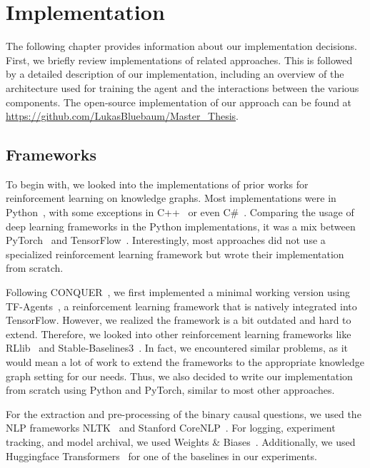 %
\chapter{Implementation}
\label{ch:implementation}

The following chapter provides information about our implementation decisions.
First, we briefly review implementations of related approaches. This is 
followed by a detailed description of our implementation, 
including an overview of the architecture used for training the agent and the interactions between the various components.
The open-source implementation of our approach can be found at \url{https://github.com/LukasBluebaum/Master_Thesis}.

\section{Frameworks}
\label{sec:frameworks}

To begin with, we looked into the implementations of prior works for reinforcement 
learning on knowledge graphs. Most implementations were in Python~\cite{Xiong2017DeePpath,Das2018Minerva, Kaiser2021Reinforcement},
with some exceptions in C++~\cite{Zhang2018Variational} or even C\#~\cite{Shen2018MWalk}.
Comparing the usage of deep learning frameworks in the Python implementations, it was a mix between PyTorch~\cite{Paszke2019Torch} and TensorFlow~\cite{Abadi2015Tensorflow}.
Interestingly, most approaches did not use a specialized reinforcement learning framework but
wrote their implementation from scratch. 

Following CONQUER~\cite{Kaiser2021Reinforcement}, we first implemented a minimal working version using TF-Agents~\cite{Guadarrama2018TFAgents}, 
a reinforcement learning framework that is natively integrated into TensorFlow.
However, we realized the framework is a bit outdated and hard to extend.
Therefore, we looked into other reinforcement learning frameworks like RLlib~\cite{Liang2018rllib} 
and Stable-Baselines3~\cite{Raffin2021Stable}.
In fact, we encountered similar problems, as it would mean a lot of work to extend the frameworks to the appropriate knowledge graph setting for our needs.
Thus, we also decided to write our implementation from scratch using Python and PyTorch, similar 
to most other approaches.

For the extraction and pre-processing of the binary causal questions, we used the NLP frameworks 
NLTK~\cite{BirdKleinLoper2009NLTK} and Stanford CoreNLP~\cite{Manning2014NLP}.
For logging, experiment tracking, and model archival, we used Weights \& Biases~\cite{Biewald2020Wandb}.
Additionally, we used Huggingface Transformers~\cite{Wolf2020Transformers} for one of the baselines in 
our experiments.

